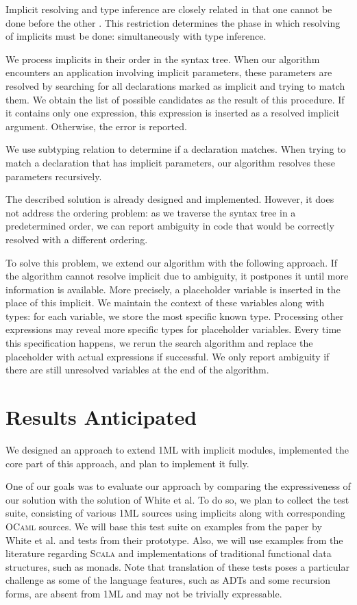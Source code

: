 \documentclass{spbau-diploma}
\begin{document}
Implicit resolving and type inference are closely related in that one cannot be done before the other \cite{white}. This restriction determines the phase in which resolving of implicits must be done: simultaneously with type inference. 

We process implicits in their order in the syntax tree. When our algorithm encounters an application involving implicit parameters, these parameters are resolved by searching for all declarations marked as implicit and trying to match them. We obtain the list of possible candidates as the result of this procedure. If it contains only one expression, this expression is inserted as a resolved implicit argument. Otherwise, the error is reported.

We use subtyping relation to determine if a declaration matches. When trying to match a declaration that has implicit parameters, our algorithm resolves these parameters recursively.

The described solution is already designed and implemented. However, it does not address the ordering problem: as we traverse the syntax tree in a predetermined order, we can report ambiguity in code that would be correctly resolved with a different ordering. 

To solve this problem, we extend our algorithm with the following approach. If the algorithm cannot resolve implicit due to ambiguity, it postpones it until more information is available. More precisely, a placeholder variable is inserted in the place of this implicit. We maintain the context of these variables along with types: for each variable, we store the most specific known type. Processing other expressions may reveal more specific types for placeholder variables. Every time this specification happens, we rerun the search algorithm and replace the placeholder with actual expressions if successful. We only report ambiguity if there are still unresolved variables at the end of the algorithm.

\section{Results Anticipated}

We designed an approach to extend \textsc{1ML} with implicit modules, implemented the core part of this approach, and plan to implement it fully.

One of our goals was to evaluate our approach by comparing the expressiveness of our solution with the solution of White et al. To do so, we plan to collect the test suite, consisting of various \textsc{1ML} sources using implicits along with corresponding \textsc{OCaml} sources. We will base this test suite on examples from the paper by White et al. and tests from their prototype. Also, we will use examples from the literature regarding \textsc{Scala} and implementations of traditional functional data structures, such as monads. Note that translation of these tests poses a particular challenge as some of the language features, such as ADTs and some recursion forms, are absent from \textsc{1ML} and may not be trivially expressable. 
\end{document}
